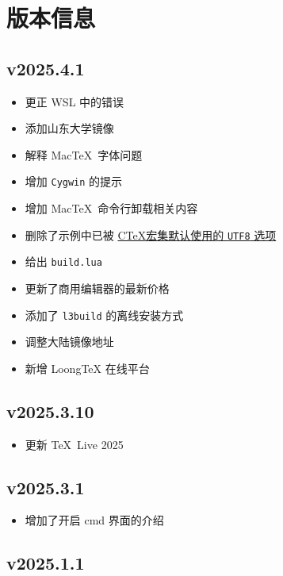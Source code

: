 
\chapter{版本信息}

\section*{v2025.4.1}

\begin{itemize}
  \item 更正 WSL 中的错误
  \item 添加山东大学镜像
  \item 解释 Mac\TeX\ 字体问题
  \item 增加 \texttt{Cygwin} 的提示
  \item 增加 Mac\TeX\ 命令行卸载相关内容
  \item 删除了示例中已被
  \href{http://mirrors.ctan.org/language/chinese/ctex/ctex.pdf#page6}{C\TeX 宏集默认使用的 \texttt{UTF8} 选项}
  \item 给出 \texttt{build.lua}
  \item 更新了商用编辑器的最新价格
  \item 添加了 \texttt{l3build} 的离线安装方式
  \item 调整大陆镜像地址
  \item 新增 LoongTeX 在线平台
\end{itemize}

\section*{v2025.3.10}

\begin{itemize}
  \item 更新 \TeX\ Live 2025
\end{itemize}

\section*{v2025.3.1}

\begin{itemize}
  \item 增加了开启 \textsf{cmd} 界面的介绍
\end{itemize}

\section*{v2025.1.1}

